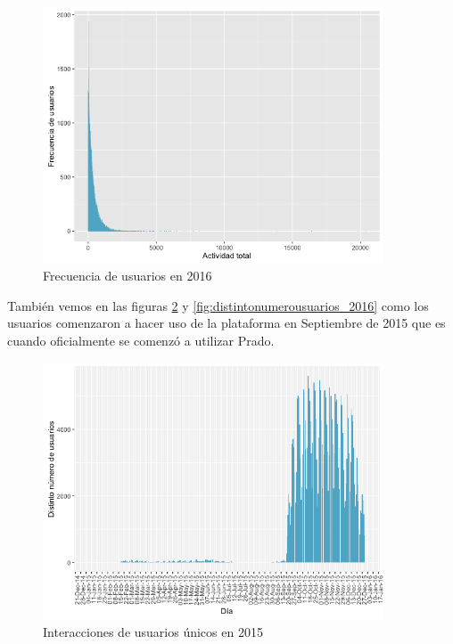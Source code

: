 \begin{figure}[H]
\centering
\includegraphics[width=0.9\textwidth]{../r/frecuenciausuarios_2016}
\caption{Frecuencia de usuarios en 2016}
\label{fig:frecuenciausuarios_2016}
\end{figure}

También vemos en las figuras \ref{fig:distintonumerousuarios_2015} y \ref{fig:distintonumerousuarios_2016} como los usuarios comenzaron a hacer uso de la plataforma en Septiembre de 2015 que es cuando oficialmente se comenzó a utilizar Prado.



\begin{figure}[H]
\centering
\includegraphics[width=0.9\textwidth]{../r/distintonumerousuarios_2015}
\caption{Interacciones de usuarios únicos en 2015}
\label{fig:distintonumerousuarios_2015}
\end{figure}


